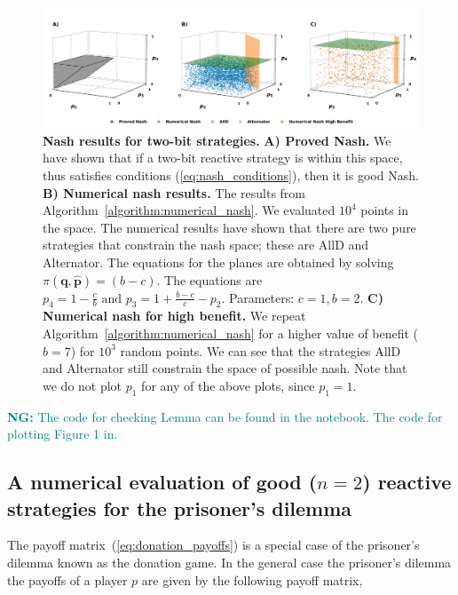 \documentclass{article}
\theoremstyle{definition}
\newcommand{\nikoleta}[1]{\textcolor{teal}{{\bf NG:} #1}}
\begin{document}
\begin{figure}[!htbp]
     \centering
     \includegraphics[width=\textwidth]{static/two_bit_reactive_numerical_results.pdf}
     \caption{\textbf{Nash results for two-bit strategies.}
     \textbf{A) Proved Nash.} We have shown that if a two-bit reactive
     strategy is within this space, thus satisfies conditions
     (\ref{eq:nash_conditions}), then it is good Nash. \textbf{B) Numerical nash
     results.} The results from
     Algorithm~\ref{algorithm:numerical_nash}. We evaluated \(10 ^ 4\) points in
     the space. The numerical results have shown that there are two pure
     strategies that constrain the nash space; these are AllD and Alternator.
     The equations for the planes are obtained by solving
     \(\pi(\mathbf{q}, \mathbf{\hat{p}}) = (b - c)\). The equations are
     \(p_4 = 1 - \frac{c}{b} \text{ and }  p_3 = 1 + \frac{b - c}{c} - p_2\).
      Parameters: \(c=1, b=2\). \textbf{C) Numerical nash for high benefit.} We repeat
     Algorithm~\ref{algorithm:numerical_nash} for a higher value of benefit
     (\(b=7\)) for \(10 ^ 3\) random points. We can see that the strategies AllD
     and Alternator still constrain the space of possible nash. Note that we do
     not plot \(p_1\) for any of the above plots, since \(p_1=1\).}\label{fig:two_bit_reactive_nash_results}
\end{figure}

\nikoleta{The code for checking Lemma can be found in the notebook. The code
for plotting Figure 1 in.}

\subsection{A numerical evaluation of good (\(n=2\)) reactive strategies for the prisoner's dilemma}\label{section:good_strategies_numerically_pd}

The payoff matrix~(\ref{eq:donation_payoffs}) is a special case of the
prisoner's dilemma known as the donation game. In the general case the
prisoner's dilemma the payoffs of a player \(p\) are given by the following
payoff matrix,
\end{document}
